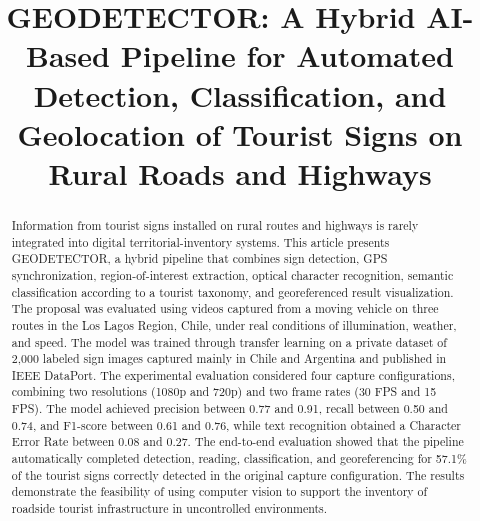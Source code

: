 \documentclass[conference]{IEEEtran}
\begin{document}
\title{GEODETECTOR: A Hybrid AI-Based Pipeline for Automated Detection, Classification, and Geolocation of Tourist Signs on Rural Roads and Highways}

\author{
\and
{}
\and
{}
}

\IEEEoverridecommandlockouts
{}
\maketitle

\begin{abstract}
Information from tourist signs installed on rural routes and highways
is rarely integrated into digital territorial-inventory systems. This
article presents GEODETECTOR, a hybrid pipeline that combines sign
detection, GPS synchronization, region-of-interest extraction, optical
character recognition, semantic classification according to a tourist
taxonomy, and georeferenced result visualization. The proposal was
evaluated using videos captured from a moving vehicle on three routes in
the Los Lagos Region, Chile, under real conditions of illumination,
weather, and speed. The model was trained through transfer learning on a
private dataset of 2,000 labeled sign images captured mainly in Chile and
Argentina and published in IEEE DataPort. The experimental evaluation
considered four capture configurations, combining two resolutions
(1080p and 720p) and two frame rates (30 FPS and 15 FPS). The model
achieved precision between 0.77 and 0.91, recall between 0.50 and 0.74,
and F1-score between 0.61 and 0.76, while text recognition obtained a
Character Error Rate between 0.08 and 0.27. The end-to-end evaluation
showed that the pipeline automatically completed detection, reading,
classification, and georeferencing for 57.1\% of the tourist signs
correctly detected in the original capture configuration. The results
demonstrate the feasibility of using computer vision to support the
inventory of roadside tourist infrastructure in uncontrolled environments.
\end{abstract}
\end{document}
